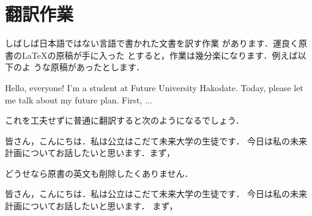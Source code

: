

\section{翻訳作業}
しばしば日本語ではない言語で書かれた文書を訳す作業
があります．運良く原書の{\LaTeX}の原稿が手に入った
とすると，作業は幾分楽になります．例えば以下のよ
うな原稿があったとします．

\begin{InTeX}
Hello, everyone! I'm a student at Future University Hakodate. 
Today, please let me talk about my future plan. 
First, ...
\end{InTeX}

これを工夫せずに普通に翻訳すると次のようになるでしょう．

\begin{InTeX}
皆さん，こんにちは．私は公立はこだて未来大学の生徒です．
今日は私の未来計画についてお話したいと思います．まず，
\end{InTeX}

どうせなら原書の英文も削除したくありません．

\begin{InTeX}
皆さん，こんにちは．私は公立はこだて未来大学の生徒です．
今日は私の未来計画についてお話したいと思います．
まず，
\end{InTeX}

